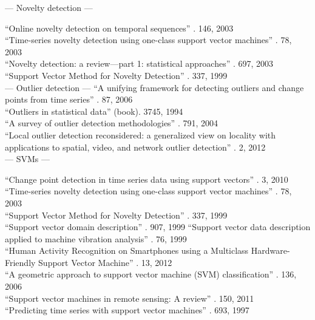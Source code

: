 --- Novelty detection ---

``Online novelty detection on temporal sequences'' \cite{ma2003online}. 146, 2003 \\
``Time-series novelty detection using one-class support vector machines'' \cite{ma2003time}. 78, 2003 \\

``Novelty detection: a review—part 1: statistical approaches'' \cite{markou2003novelty}. 697, 2003 \\

``Support Vector Method for Novelty Detection'' \cite{scholkopf1999support}. 337, 1999 \\


--- Outlier detection ---
``A unifying framework for detecting outliers and change points from time series'' \cite{takeuchi2006unifying}. 87, 2006 \\

``Outliers in statistical data'' \cite{barnett1994outliers} (book). 3745, 1994 \\

``A survey of outlier detection methodologies'' \cite{hodge2004survey}. 791, 2004 \\

``Local outlier detection reconsidered: a generalized view on locality with applications to spatial, video, and network outlier detection'' \cite{schubert2012local}. 2, 2012 \\


--- SVMs ---

``Change point detection in time series data using support vectors'' \cite{camci2010change}. 3, 2010 \\

``Time-series novelty detection using one-class support vector machines'' \cite{ma2003time}. 78, 2003 \\

``Support Vector Method for Novelty Detection'' \cite{scholkopf1999support}. 337, 1999 \\

``Support vector domain description'' \cite{tax1999support}. 907, 1999
``Support vector data description applied to machine vibration analysis'' \cite{tax1999supportdata}. 76, 1999 \\

``Human Activity Recognition on Smartphones using a Multiclass Hardware-Friendly Support Vector Machine'' \cite{anguitahuman}. 13, 2012 \\

``A geometric approach to support vector machine (SVM) classification'' \cite{mavroforakis2006geometric}. 136, 2006 \\

``Support vector machines in remote sensing: A review'' \cite{mountrakis2011support}. 150, 2011 \\

``Predicting time series with support vector machines'' \cite{muller1997predicting}. 693, 1997 \\

